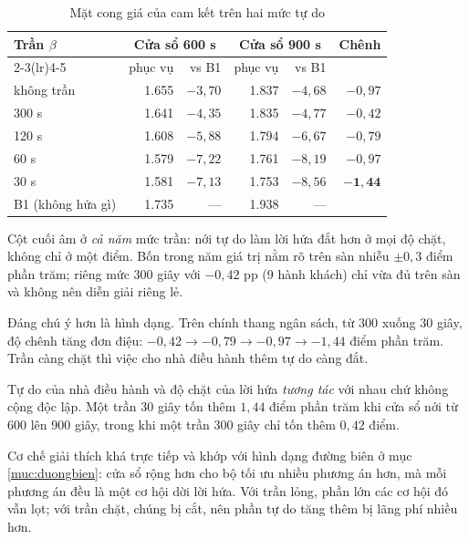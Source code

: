 \begin{table}[htbp]
\centering
\caption{Mặt cong giá của cam kết trên hai mức tự do}
\label{bang:matcong}
\small
\begin{tabular}{@{}lrrrrr@{}}
\toprule
\multirow{2}{*}{\textbf{Trần $\beta$}} & \multicolumn{2}{c}{\textbf{Cửa sổ 600 s}} & \multicolumn{2}{c}{\textbf{Cửa sổ 900 s}} & \multirow{2}{*}{\textbf{Chênh}}\\
\cmidrule(lr){2-3}\cmidrule(lr){4-5}
 & phục vụ & vs B1 & phục vụ & vs B1 & \\
\midrule
không trần & 1.655 & $-3{,}70$ & 1.837 & $-4{,}68$ & $-0{,}97$\\
300 s & 1.641 & $-4{,}35$ & 1.835 & $-4{,}77$ & $-0{,}42$\\
120 s & 1.608 & $-5{,}88$ & 1.794 & $-6{,}67$ & $-0{,}79$\\
60 s & 1.579 & $-7{,}22$ & 1.761 & $-8{,}19$ & $-0{,}97$\\
30 s & 1.581 & $-7{,}13$ & 1.753 & $-8{,}56$ & $\mathbf{-1{,}44}$\\
\midrule
B1 (không hứa gì) & 1.735 & --- & 1.938 & --- & \\
\bottomrule
\end{tabular}
\end{table}

Cột cuối âm ở \emph{cả năm} mức trần: nới tự do làm lời hứa đắt hơn ở mọi độ chặt, không chỉ ở
một điểm. Bốn trong năm giá trị nằm rõ trên sàn nhiễu $\pm 0{,}3$ điểm phần trăm; riêng mức
300 giây với $-0{,}42$ pp (9 hành khách) chỉ vừa đủ trên sàn và không nên diễn giải riêng lẻ.

Đáng chú ý hơn là hình dạng. Trên chính thang ngân sách, từ 300 xuống 30 giây, độ chênh tăng
đơn điệu: $-0{,}42 \to -0{,}79 \to -0{,}97 \to -1{,}44$ điểm phần trăm. Trần càng chặt thì việc
cho nhà điều hành thêm tự do càng đắt.

\begin{khungy}
Tự do của nhà điều hành và độ chặt của lời hứa \emph{tương tác} với nhau chứ không cộng độc
lập. Một trần 30 giây tốn thêm $1{,}44$ điểm phần trăm khi cửa sổ nới từ 600 lên 900 giây,
trong khi một trần 300 giây chỉ tốn thêm $0{,}42$ điểm.
\end{khungy}

Cơ chế giải thích khá trực tiếp và khớp với hình dạng đường biên ở mục \ref{muc:duongbien}: cửa sổ rộng hơn cho bộ tối ưu nhiều
phương án hơn, mà mỗi phương án đều là một cơ hội dời lời hứa. Với trần lỏng, phần lớn các cơ
hội đó vẫn lọt; với trần chặt, chúng bị cắt, nên phần tự do tăng thêm bị lãng phí nhiều hơn.

